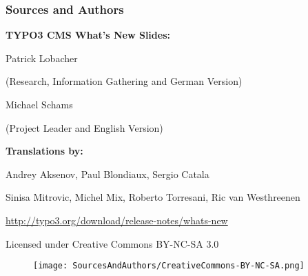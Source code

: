 \begin{frame}[fragile]
	\frametitle{Sources and Authors}

	\vspace{-0.6cm}

	\centerline{\textbf{TYPO3 CMS What's New Slides:}}

	\begin{center}
		\smaller
			\centerline{Patrick Lobacher}
			\centerline{(Research, Information Gathering and German Version)}
			\vspace{0.1cm}
			\centerline{Michael Schams}
			\centerline{(Project Leader and English Version)}
		\normalsize
	\end{center}
	\vspace{-0.6cm}
	\begin{center}
		\smaller
			\centerline{\textbf{Translations by:}}
			\centerline{Andrey Aksenov, Paul Blondiaux, Sergio Catala}
			\centerline{Sinisa Mitrovic, Michel Mix, Roberto Torresani, Ric van Westhreenen}
		\normalsize
	\end{center}
	\vspace{-0.6cm}
	\smaller\begin{center}\url{http://typo3.org/download/release-notes/whats-new}\end{center}\normalsize

	\smaller\begin{center}Licensed under Creative Commons BY-NC-SA 3.0\end{center}\normalsize
	\begin{figure}\vspace*{-0.3cm}
		\texttt{[image: SourcesAndAuthors/CreativeCommons-BY-NC-SA.png]}
	\end{figure}

\end{frame}

